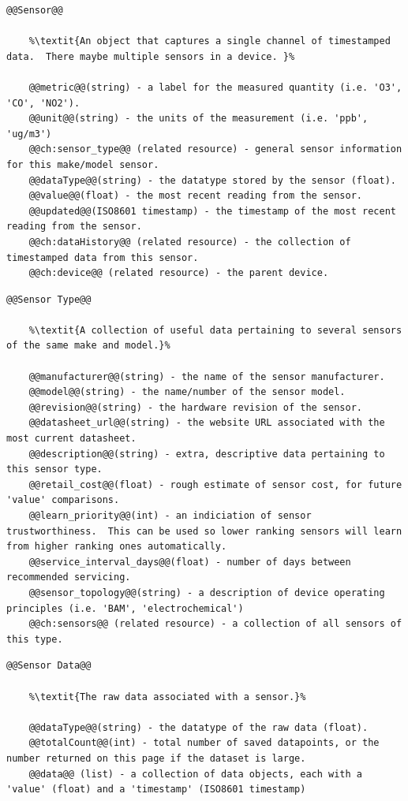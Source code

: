 \begin{lstlisting}[style=codedef]
@@Sensor@@
	
	%\textit{An object that captures a single channel of timestamped data.  There maybe multiple sensors in a device. }%

	@@metric@@(string) - a label for the measured quantity (i.e. 'O3', 'CO', 'NO2').
	@@unit@@(string) - the units of the measurement (i.e. 'ppb', 'ug/m3')
	@@ch:sensor_type@@ (related resource) - general sensor information for this make/model sensor.
	@@dataType@@(string) - the datatype stored by the sensor (float).
	@@value@@(float) - the most recent reading from the sensor.	
	@@updated@@(ISO8601 timestamp) - the timestamp of the most recent reading from the sensor.
	@@ch:dataHistory@@ (related resource) - the collection of timestamped data from this sensor.
	@@ch:device@@ (related resource) - the parent device.

\end{lstlisting}

\begin{lstlisting}[style=codedef]
@@Sensor Type@@
	
	%\textit{A collection of useful data pertaining to several sensors of the same make and model.}%

	@@manufacturer@@(string) - the name of the sensor manufacturer.
	@@model@@(string) - the name/number of the sensor model.
	@@revision@@(string) - the hardware revision of the sensor.
	@@datasheet_url@@(string) - the website URL associated with the most current datasheet.
	@@description@@(string) - extra, descriptive data pertaining to this sensor type.
	@@retail_cost@@(float) - rough estimate of sensor cost, for future 'value' comparisons.
	@@learn_priority@@(int) - an indiciation of sensor trustworthiness.  This can be used so lower ranking sensors will learn from higher ranking ones automatically.
	@@service_interval_days@@(float) - number of days between recommended servicing.
	@@sensor_topology@@(string) - a description of device operating principles (i.e. 'BAM', 'electrochemical')
	@@ch:sensors@@ (related resource) - a collection of all sensors of this type.

\end{lstlisting}

\begin{lstlisting}[style=codedef]
@@Sensor Data@@
	
	%\textit{The raw data associated with a sensor.}%

	@@dataType@@(string) - the datatype of the raw data (float).
	@@totalCount@@(int) - total number of saved datapoints, or the number returned on this page if the dataset is large.
	@@data@@ (list) - a collection of data objects, each with a 'value' (float) and a 'timestamp' (ISO8601 timestamp)

\end{lstlisting}

